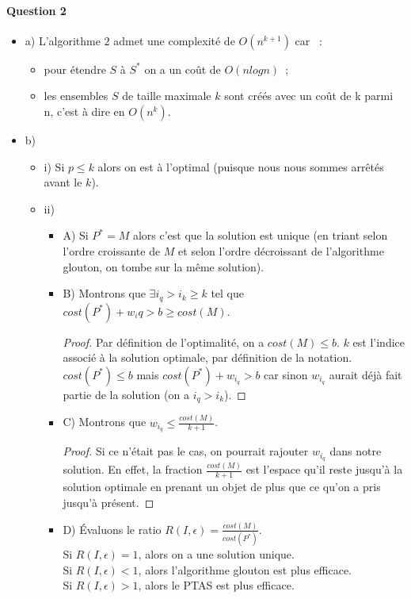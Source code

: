 \paragraph{Question 2}
\begin{itemize}
\item a) L'algorithme $2$ admet une complexité de $O(n^{k+1})$ car ~:
\begin{itemize}
\item pour étendre $S$ à $S^*$ on a un coût de $O(nlogn)$~;
\item les ensembles $S$ de taille maximale $k$ sont créés avec un coût
de k parmi n, c'est à dire en $O(n^k)$.
\end{itemize}
\item b)
\begin{itemize}
\item i) Si $p \leq k$ alors on est à l'optimal (puisque nous nous sommes
arrêtés avant le $k$).
\item ii)
\begin{itemize}
\item A) Si $P^*=M$ alors c'est que la solution est unique (en triant
selon l'ordre croissante de $M$ et selon l'ordre décroissant de
l'algorithme glouton, on tombe sur la même solution).
\item B) Montrons que $\exists i_q > i_k \geq k$ tel que
$cost(P^*)+w_iq > b \geq cost(M)$.
\begin{proof}
Par définition de l'optimalité, on a $cost(M) \leq b$. $k$ est
l'indice associé à la solution optimale, par définition de la
notation. \\
$cost(P^*) \leq b$ mais $cost(P^*) + w_{i_q} > b$ car sinon $w_{i_q}$
aurait déjà fait partie de la solution (on a $i_q > i_k$). 
\end{proof}
\item C) Montrons que $w_{i_q} \leq \frac{cost(M)}{k+1}$.
\begin{proof}
Si ce n'était pas le cas, on pourrait rajouter $w_{i_q}$ dans
notre solution. En effet, la fraction $\frac{cost(M)}{k+1}$ est
l'espace qu'il reste jusqu'à la solution optimale en prenant un objet
de plus que ce qu'on a pris jusqu'à présent.
\end{proof}
\item D) Évaluons le ratio $R(I, \epsilon)
= \frac{cost(M)}{cost(P^*)}$. \\
Si $R(I, \epsilon) = 1$, alors on a une solution unique. \\
Si $R(I, \epsilon) < 1$, alors l'algorithme glouton est plus efficace. \\
Si $R(I, \epsilon) > 1$, alors le PTAS est plus efficace. \\
\end{itemize}
\end{itemize}
\end{itemize}
